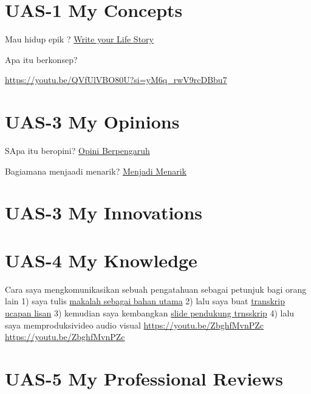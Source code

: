\documentclass[
  letterpaper,
  DIV=11,
  numbers=noendperiod]{scrreprt}
\begin{document}

\chapter{UAS-1 My Concepts}\label{uas-1-my-concepts}

Mau hidup epik ? \href{lifestory.pdf}{Write your Life Story}

Apa itu berkonsep?

\url{https://youtu.be/QVfUlVBO80U?si=yM6q_rwV9rcDBbu7}


\chapter{UAS-3 My Opinions}\label{uas-3-my-opinions}

SApa itu beropini? \href{BM\%20Opini.mp4}{Opini Berpengaruh}

Bagiamana menjaadi menarik? \href{./Interesting.mp4}{Menjadi Menarik}


\chapter{UAS-3 My Innovations}\label{uas-3-my-innovations}


\chapter{UAS-4 My Knowledge}\label{uas-4-my-knowledge}

Cara saya mengkomunikasikan sebuah pengatahuan sebagai petunjuk bagi
orang lain 1) saya tulis
\href{Rekomendasi\%20Presentasi\%20Efektif(Contoh\%20Makalah).pdf}{makalah
sebagai bahan utama} 2) lalu saya buat
\href{Contoh\%20Transkrip\%20Presentasi.pdf}{transkrip ucapan lisan} 3)
kemudian saya kembangkan
\href{Rekomendasi\%20Presentasi\%20(Contoh\%20Slides).pdf}{slide
pendukung trnsskrip} 4) lalu saya memproduksivideo audio visual
\url{https://youtu.be/ZbghfMvnPZc} \url{https://youtu.be/ZbghfMvnPZc}


\chapter{UAS-5 My Professional
Reviews}\label{uas-5-my-professional-reviews}
\end{document}

